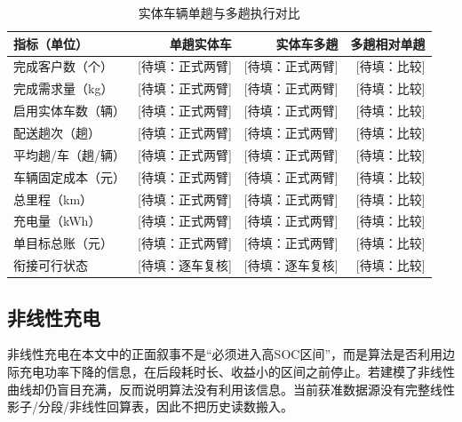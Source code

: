 \documentclass{setp-new}
\DeclareRobustCommand{\TBD}[1]{%
  \begingroup\setlength{\fboxsep}{1.2pt}%
  \colorbox{black!12}{\textcolor{black!65}{\textsf{\footnotesize[待填：#1]}}}%
  \endgroup}
\begin{document}
\begin{table}[htbp]
  \centering
  \caption{实体车辆单趟与多趟执行对比}
  \label{tab:multitrip}
  \small
  \begin{tabular}{lrrr}
    \toprule
    指标（单位） & 单趟实体车 & 实体车多趟 & 多趟相对单趟\\
    \midrule
    完成客户数（个） & \TBD{正式两臂} & \TBD{正式两臂} & \TBD{比较}\\
    完成需求量（kg） & \TBD{正式两臂} & \TBD{正式两臂} & \TBD{比较}\\
    启用实体车数（辆） & \TBD{正式两臂} & \TBD{正式两臂} & \TBD{比较}\\
    配送趟次（趟） & \TBD{正式两臂} & \TBD{正式两臂} & \TBD{比较}\\
    平均趟/车（趟/辆） & \TBD{正式两臂} & \TBD{正式两臂} & \TBD{比较}\\
    车辆固定成本（元） & \TBD{正式两臂} & \TBD{正式两臂} & \TBD{比较}\\
    总里程（km） & \TBD{正式两臂} & \TBD{正式两臂} & \TBD{比较}\\
    充电量（kWh） & \TBD{正式两臂} & \TBD{正式两臂} & \TBD{比较}\\
    单目标总账（元） & \TBD{正式两臂} & \TBD{正式两臂} & \TBD{比较}\\
    衔接可行状态 & \TBD{逐车复核} & \TBD{逐车复核} & \TBD{比较}\\
    \bottomrule
  \end{tabular}
\end{table}

\subsection{非线性充电}

非线性充电在本文中的正面叙事不是“必须进入高SOC区间”，而是算法是否利用边际充电功率下降的信息，在后段耗时长、收益小的区间之前停止。若建模了非线性曲线却仍盲目充满，反而说明算法没有利用该信息。当前获准数据源没有完整线性影子/分段/非线性回算表，因此不把历史读数搬入。
\end{document}

